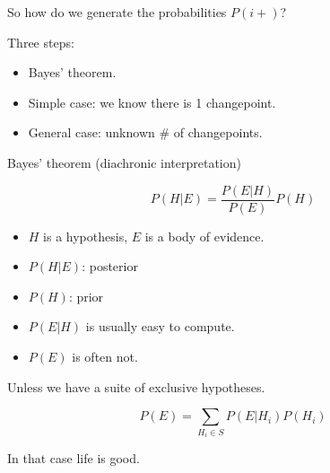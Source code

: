 \documentclass[pdf,allen]{prosper}
\begin{document}
\begin{slide}{}

So how do we generate the probabilities $P(i+)$?

\vspace{0.1in}

Three steps:

\begin{itemize}

\item Bayes' theorem.

\item Simple case: we know there is 1 changepoint.

\item General case: unknown \# of changepoints.

\end{itemize}


\end{slide}


\begin{slide}{}

Bayes' theorem (diachronic interpretation)

\[ P(H|E) = \frac{P(E|H)}{P(E)} P(H) \]

\begin{itemize}

\item $H$ is a hypothesis, $E$ is a body of evidence.

\item $P(H|E)$: posterior

\item $P(H)$: prior

\item $P(E|H)$ is usually easy to compute.

\item $P(E)$ is often not.

\end{itemize}


\end{slide}


\begin{slide}{}

Unless we have a suite of exclusive hypotheses.

\[ P(E) = \sum_{H_i \in S} P(E|H_i) P(H_i) \]

In that case life is good.

\end{slide}
\end{document}
